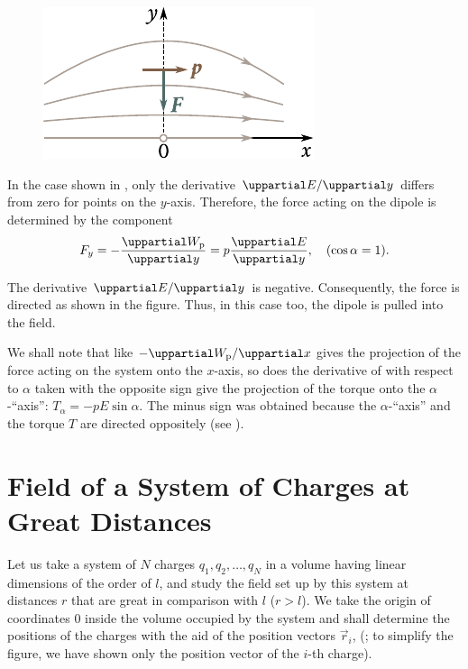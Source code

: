 \begin{figure}[t]
	\begin{center}
		\includegraphics[scale=1]{figures/ch_01/fig_1_15.pdf}
		\caption[]{}
		\label{fig:1_15}
	\end{center}
	\vspace{-0.8cm}
\end{figure}

In the case shown in , only the derivative $\diffinpartial{E}{y}$ differs from zero for points on the $y$-axis. Therefore, the force acting on the dipole is determined by the component
\begin{equation*}
	F_y = -\diffpartial{\ab{W}{p}}{y} = p \diffpartial{E}{y},\quad (\cos\alpha=1).
\end{equation*}

\noindent
The derivative $\diffinpartial{E}{y}$ is negative. Consequently, the force is directed as shown in the figure. Thus, in this case too, the dipole is pulled into the field.

We shall note that like $-\diffinpartial{\ab{W}{p}}{x}$ gives the projection of the force acting on the system onto the $x$-axis, so does the derivative of  with respect to $\alpha$ taken with the opposite sign give the projection of the torque onto the $\alpha$-``axis'': $T_{\alpha}=-pE\sin\alpha$. The minus sign was obtained because the $\alpha$-``axis'' and the torque $T$ are directed oppositely (see ).

\section{Field of a System of Charges at Great Distances}\label{sec:1_10}

Let us take a system of $N$ charges $q_1, q_2, \ldots, q_N$ in a volume having linear dimensions of the order of $l$, and study the field set up by this system at distances $r$ that are great in comparison with $l$ ($r>l$). We take the origin of coordinates $0$ inside the volume occupied by the system and shall determine the positions of the charges with the aid of the position vectors $\vec{r}_i$, (; to simplify the figure, we have shown only the position vector of the $i$-th charge).

